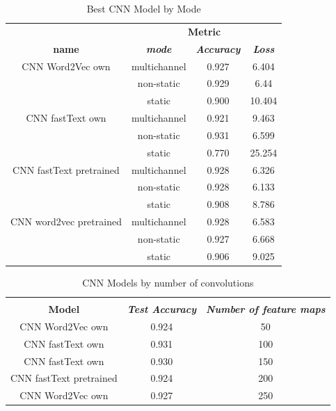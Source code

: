 \documentclass[conference]{IEEEtran}
\begin{document}
\begin{table}[htbp]
\caption{Best CNN Model by Mode}
\begin{center}
\begin{tabular}{|c|c|c|c|}
\hline
\textbf{}&\multicolumn{3}{|c|}{\textbf{Metric}} \\ 
\cline{2-4}
\textbf{name} & \textbf{\textit{mode}}& \textbf{\textit{Accuracy}}& \textbf{\textit{Loss}} \\ 
\hline
CNN Word2Vec own & multichannel & 0.927 & 6.404 \\ 
\cline{2-4}
 & non-static & 0.929 & 6.44 \\ 
\cline{2-4}
 & static & 0.900 & 10.404 \\ 
\hline
CNN fastText own & multichannel & 0.921 & 9.463 \\ 
\cline{2-4}
 & non-static & 0.931 & 6.599 \\ 
\cline{2-4}
& static & 0.770 & 25.254 \\ 
\hline
CNN fastText pretrained & multichannel & 0.928 & 6.326 \\ 
\cline{2-4}
 & non-static & 0.928 & 6.133 \\ 
\cline{2-4}
 & static & 0.908 & 8.786 \\ 
\hline
CNN word2vec pretrained & multichannel & 0.928 & 6.583 \\ 
\cline{2-4}
& non-static & 0.927 & 6.668 \\ 
\cline{2-4}
& static & 0.906 & 9.025 \\ 
\hline
\end{tabular}
\label{taba1}
\end{center}
\end{table}

\begin{table}[htbp]
\caption{CNN Models by number of convolutions}
\begin{center}
\begin{tabular}{|c|c|c|}
\hline
\textbf{}&\multicolumn{2}{|c|}{\textbf{}} \\ 
\cline{2-3}
\textbf{Model} & \textbf{\textit{Test Accuracy}}& \textbf{\textit{Number of feature maps}} \\ 
\hline
CNN Word2Vec own & 0.924 & 50 \\ 
\hline
CNN fastText own & 0.931 & 100 \\ 
\hline
CNN fastText own & 0.930& 150 \\ 
\hline
CNN fastText pretrained & 0.924 & 200 \\ 
\hline
CNN Word2Vec own & 0.927 & 250 \\ 
\hline
\end{tabular}
\label{tabfmaps}
\end{center}
\end{table}
\end{document}
